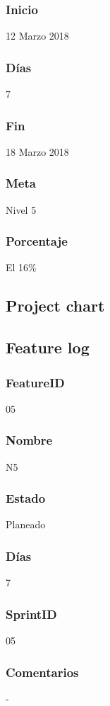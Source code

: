\subsubsection{Inicio}
12 Marzo 2018
\subsubsection{Días}
7
\subsubsection{Fin}
18 Marzo 2018
\subsubsection{Meta}
Nivel 5
\subsubsection{Porcentaje}
El 16\% 


\subsection{Project chart}



\subsection{Feature log}

\subsubsection{FeatureID}
05
\subsubsection{Nombre}
N5
\subsubsection{Estado}
Planeado
\subsubsection{Días}
7
\subsubsection{SprintID}
05
\subsubsection{Comentarios}
-


